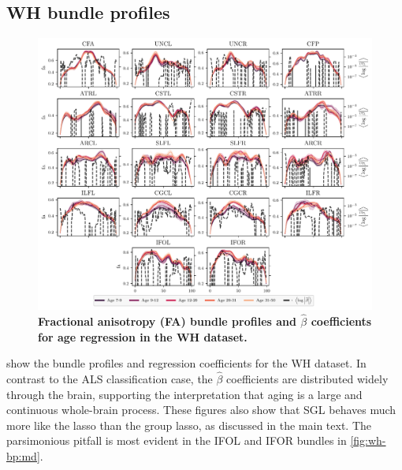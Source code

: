 \documentclass[10pt,%
               aps,%
               prl,%
               preprint,%
               superscriptaddress,%
               preprintnumbers,%
               amsmath,%
               floatfix,%
               endfloats*]{revtex4-2}
\begin{document}
\subsection{WH bundle profiles}

\begin{figure}
    \includegraphics[width=\textwidth]{wh_coefs_profiles_fa.pdf}
    \caption{%
        {%
            \bf Fractional anisotropy (FA) bundle profiles and $\hat{\beta}$
            coefficients for age regression in the WH dataset.
        }
        \label{fig:wh-bp:fa}
    }
\end{figure}

 show the bundle profiles and regression
coefficients for the WH dataset. In contrast to the ALS classification case,
the $\hat{\beta}$ coefficients are distributed widely through the brain, supporting
the interpretation that aging is a large and continuous whole-brain process.
These figures also show that SGL behaves much more like the lasso than the group
lasso, as discussed in the main text. The parsimonious pitfall is most evident in
the IFOL and IFOR bundles in \cref{fig:wh-bp:md}.
\end{document}
